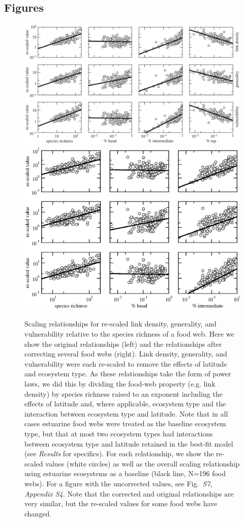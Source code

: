 \documentclass[12pt]{article}
\begin{document}
\begin{spacing}{2.0}
\clearpage

\section*{Figures}

\setcounter{figure}{1}

\begin{figure}[h]
\includegraphics*[width=.48\textwidth]{Figures/Figure2.eps}
\hspace{.02\textwidth}
\includegraphics*[width=.48\textwidth]{Figures/Figure2_updated.eps}

\caption{Scaling relationships for re-scaled link density, generality, and vulnerability 
relative to the species richness of a food web. Here we show the original relationships (left)
and the relationships after correcting several food webs (right). Link density, generality,
and vulnerability were each re-scaled to remove the effects of latitude and ecosystem
type. As these relationships take the form of power laws, we did this by dividing the food-web
property (e.g. link density) by species richness raised to an exponent including the 
effects of latitude and, where applicable, ecosystem type and the interaction between ecosystem
type and latitude. Note that in all cases estuarine food webs were treated as the baseline 
ecosystem type, but that at most two ecosystem types had interactions between ecosystem type and
latitude retained in the best-fit model (see \emph{Results} for specifics). For each relationship, 
we show the re-scaled values (white circles) as well as the overall scaling relationship using estuarine
ecosystems as a baseline (black line, N=196 food webs). For a figure with the uncorrected values,
see Fig.~\emph{S7}, \emph{Appendix S4}. Note that the corrected and original relationships are 
very similar, but the re-scaled values for some food webs have changed.
}
\label{props_v_lat1}
\end{figure}



\end{spacing}
\end{document}
